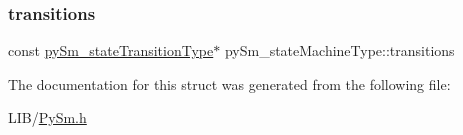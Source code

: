 \subsubsection{\texorpdfstring{transitions}{transitions}}
{\footnotesize\ttfamily const \hyperlink{structpySm__stateTransitionType}{py\+Sm\+\_\+state\+Transition\+Type}$\ast$ py\+Sm\+\_\+state\+Machine\+Type\+::transitions}



The documentation for this struct was generated from the following file\+:\begin{DoxyCompactItemize}
\item 
L\+I\+B/\hyperlink{PySm_8h}{Py\+Sm.\+h}\end{DoxyCompactItemize}

